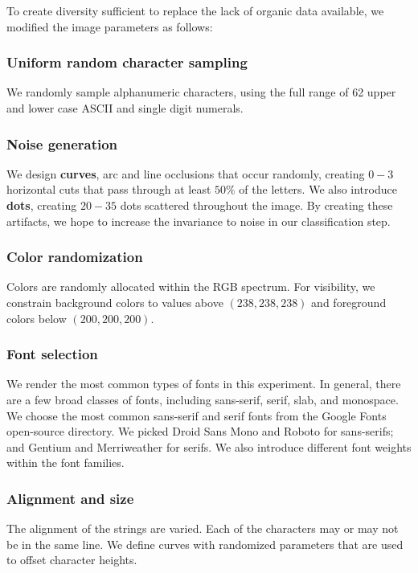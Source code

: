 \documentclass[twocolumn,10pt]{article}
\begin{document}
To create diversity sufficient to replace the lack of organic data available, we modified the image parameters as follows:

\subsubsection{Uniform random character sampling}
We randomly sample alphanumeric characters, using the full range of 62 upper and lower case ASCII and single digit numerals.

\subsubsection{Noise generation}
We design \textbf{curves}, arc and line occlusions that occur randomly, creating $0-3$ horizontal cuts that pass through at least $50\%$ of the letters. We also introduce \textbf{dots}, creating $20-35$ dots scattered throughout the image. By creating these artifacts, we hope to increase the invariance to noise in our classification step.

\subsubsection{Color randomization}
Colors are randomly allocated within the RGB spectrum. For visibility, we constrain background colors to values above $(238, 238, 238)$ and foreground colors below $(200, 200, 200)$.

\subsubsection{Font selection}
We render the most common types of fonts in this experiment. In general, there are a few broad classes of fonts, including sans-serif, serif, slab, and monospace. We choose the most common sans-serif and serif fonts from the Google Fonts open-source directory. We picked Droid Sans Mono and Roboto for sans-serifs; and Gentium and Merriweather for serifs. We also introduce different font weights within the font families.

\subsubsection{Alignment and size}
The alignment of the strings are varied. Each of the characters may or may not be in the same line. We define curves with randomized parameters that are used to offset character heights.
\end{document}
